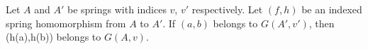 %

\begin{proposition}
  Let $A$ and $A'$ be springs with indices $v$, $v'$
  respectively. Let $(f,h)$ be an indexed spring homomorphism from $A$
  to $A'$. If $(a,b)$ belongs to $G(A',v')$, then (h(a),h(b))
  belongs to $G(A,v)$.
\end{proposition}
